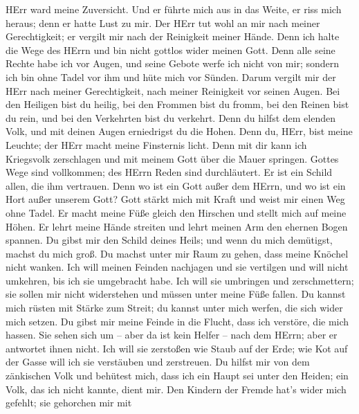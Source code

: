 HErr ward meine Zuversicht.  Und er führte mich aus in das
Weite, er riss mich heraus; denn er hatte Lust zu mir.  Der
HErr tut wohl an mir nach meiner Gerechtigkeit; er vergilt mir nach der
Reinigkeit meiner Hände.  Denn ich halte die Wege des HErrn
und bin nicht gottlos wider meinen Gott.  Denn alle seine
Rechte habe ich vor Augen, und seine Gebote werfe ich nicht von mir;
 sondern ich bin ohne Tadel vor ihm und hüte mich vor
Sünden.  Darum vergilt mir der HErr nach meiner
Gerechtigkeit, nach meiner Reinigkeit vor seinen Augen. 
Bei den Heiligen bist du heilig, bei den Frommen bist du fromm,
 bei den Reinen bist du rein, und bei den Verkehrten bist
du verkehrt.  Denn du hilfst dem elenden Volk, und mit
deinen Augen erniedrigst du die Hohen.  Denn du, HErr, bist
meine Leuchte; der HErr macht meine Finsternis licht.  Denn
mit dir kann ich Kriegsvolk zerschlagen und mit meinem Gott über die
Mauer springen.  Gottes Wege sind vollkommen; des HErrn
Reden sind durchläutert. Er ist ein Schild allen, die ihm vertrauen.
 Denn wo ist ein Gott außer dem HErrn, und wo ist ein Hort
außer unserem Gott?  Gott stärkt mich mit Kraft und weist
mir einen Weg ohne Tadel.  Er macht meine Füße gleich den
Hirschen und stellt mich auf meine Höhen.  Er lehrt meine
Hände streiten und lehrt meinen Arm den ehernen Bogen spannen.
 Du gibst mir den Schild deines Heils; und wenn du mich
demütigst, machst du mich groß.  Du machst unter mir Raum
zu gehen, dass meine Knöchel nicht wanken.  Ich will meinen
Feinden nachjagen und sie vertilgen und will nicht umkehren, bis ich sie
umgebracht habe.  Ich will sie umbringen und zerschmettern;
sie sollen mir nicht widerstehen und müssen unter meine Füße fallen.
 Du kannst mich rüsten mit Stärke zum Streit; du kannst
unter mich werfen, die sich wider mich setzen.  Du gibst
mir meine Feinde in die Flucht, dass ich verstöre, die mich hassen.
 Sie sehen sich um -- aber da ist kein Helfer -- nach dem
HErrn; aber er antwortet ihnen nicht.  Ich will sie
zerstoßen wie Staub auf der Erde; wie Kot auf der Gasse will ich sie
verstäuben und zerstreuen.  Du hilfst mir von dem
zänkischen Volk und behütest mich, dass ich ein Haupt sei unter den
Heiden; ein Volk, das ich nicht kannte, dient mir.  Den
Kindern der Fremde hat's wider mich gefehlt; sie gehorchen mir mit

